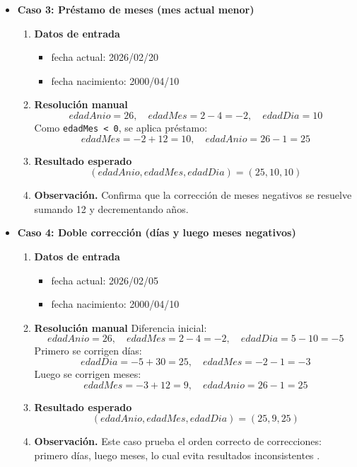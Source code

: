 \documentclass[12pt,twoside]{book}
\begin{document}
\begin{itemize}
							\item \textbf{Caso 3: Préstamo de meses (mes actual menor)}
							
							\begin{enumerate}
								\item \textbf{Datos de entrada}
								\begin{itemize}
									\item fecha actual: 2026/02/20
									\item fecha nacimiento: 2000/04/10
								\end{itemize}
								\item \textbf{Resolución manual}
								\[
								edadAnio = 26,\quad edadMes = 2 - 4 = -2,\quad edadDia = 10
								\]
								Como \texttt{edadMes < 0}, se aplica préstamo:
								\[
								edadMes = -2 + 12 = 10,\quad edadAnio = 26 - 1 = 25
								\]
								\item \textbf{Resultado esperado}
								\[
								(edadAnio,edadMes,edadDia) = (25,10,10)
								\]
								\item \textbf{Observación.} Confirma que la corrección de meses negativos se resuelve sumando 12 y decrementando años.
							\end{enumerate}
							
							\item \textbf{Caso 4: Doble corrección (días y luego meses negativos)}
							
							\begin{enumerate}
								\item \textbf{Datos de entrada}
								\begin{itemize}
									\item fecha actual: 2026/02/05
									\item fecha nacimiento: 2000/04/10
								\end{itemize}
								\item \textbf{Resolución manual}
								Diferencia inicial:
								\[
								edadAnio = 26,\quad edadMes = 2 - 4 = -2,\quad edadDia = 5 - 10 = -5
								\]
								Primero se corrigen días:
								\[
								edadDia = -5 + 30 = 25,\quad edadMes = -2 - 1 = -3
								\]
								Luego se corrigen meses:
								\[
								edadMes = -3 + 12 = 9,\quad edadAnio = 26 - 1 = 25
								\]
								\item \textbf{Resultado esperado}
								\[
								(edadAnio,edadMes,edadDia) = (25,9,25)
								\]
								\item \textbf{Observación.} Este caso prueba el orden correcto de correcciones: primero días, luego meses, lo cual evita resultados inconsistentes \cite{Sebesta2018Concepts}.
							\end{enumerate}
							

\end{itemize}
\end{document}
